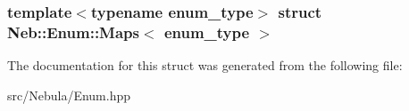\subsubsection*{template$<$typename enum\-\_\-type$>$ struct Neb\-::\-Enum\-::\-Maps$<$ enum\-\_\-type $>$}



\-The documentation for this struct was generated from the following file\-:\begin{DoxyCompactItemize}
\item 
src/\-Nebula/\-Enum.\-hpp\end{DoxyCompactItemize}
